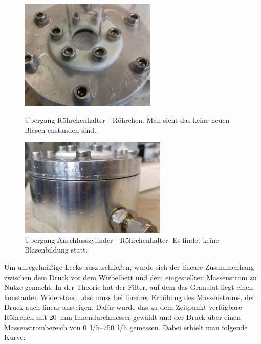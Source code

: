 \begin{figure}[h!]
	\begin{minipage}[hbt]{6.5cm}
		\centering
		\includegraphics[width=6.5cm]{Leck1_nachher.jpg}
		\caption[Leck Röhrchenansatz nachher]{Übergang Röhrchenhalter - Röhrchen. Man sieht das keine neuen Blasen enstanden sind.}
	\end{minipage}
	\hfill
	\begin{minipage}[hbt]{7cm}
		\centering
		\includegraphics[width=7cm]{Leck2_nachher.jpg}
		\caption[Leck Anschlusszylinder nachher]{Übergang Anschlusszylinder - Röhrchenhalter. Es findet keine Blasenbildung statt.}
	\end{minipage}
\end{figure}


Um unregelmäßige Lecks auszuschließen, wurde sich der lineare Zusammenhang zwischen dem Druck vor dem Wirbelbett und dem eingestellten Massenstrom zu Nutze gemacht. In der Theorie hat der Filter, auf dem das Granulat liegt einen konstanten Widerstand, also muss bei linearer Erhöhung des Massenstroms, der Druck auch linear ansteigen. Dafür wurde das zu dem Zeitpunkt verfügbare Röhrchen mit \SI{20}{mm} Innendurchmesser gewählt und der Druck über einen Massenstrombereich von \SIrange{0}{750}{l/h} gemessen. Dabei erhielt man folgende Kurve:

